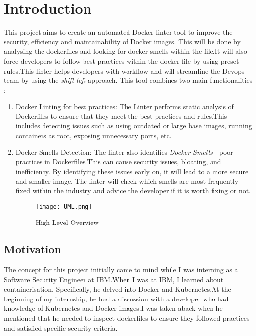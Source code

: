 \chapter{Introduction}
\label{chap:intro}
This project aims to create an automated Docker linter tool to improve the security, efficiency and maintainability of Docker images. This will be done by analysing the dockerfiles and looking for docker smells within the file.It will also force developers to follow best practices within the docker file by using preset rules.This linter helps developers with workflow and will streamline the Devops team by using the \textit{shift-left} approach. 
This tool combines two main functionalities : 
\begin{enumerate}
    \item Docker Linting for best practices:
    The Linter performs static analysis of Dockerfiles to ensure that they meet the best practices and rules.This includes detecting issues such as using outdated or large base images, running containers as root, exposing unnecessary ports, etc.
    \item Docker Smells Detection: The linter also identifies \textit{Docker Smells} - poor practices in Dockerfiles.This can cause security issues, bloating, and inefficiency. 
    By identifying these issues early on, it will lead to a more secure and smaller image. The linter will check which smells are most frequently fixed within the industry and advice the developer if it is worth fixing or not. 
\begin{figure}[ht]
  \centering
  \texttt{[image: UML.png]}
  \caption{High Level Overview} %
  \label{fig:Overview1} %
\end{figure}
\end{enumerate}

\section{Motivation}
The concept for this project initially came to mind while I was interning as a Software Security Engineer at IBM.When I was at IBM, I learned about containerisation. Specifically, he delved into Docker and Kubernetes.At the beginning of my internship, he had a discussion with a developer who had knowledge of Kubernetes and Docker images.I was taken aback when he mentioned that he needed to inspect dockerfiles to ensure they followed practices and satisfied specific security criteria.

